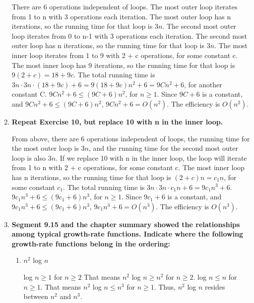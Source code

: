 \documentclass[10pt]{article}
\begin{document}
\begin{enumerate}
			\vspace{0.5cm}
			There are 6 operations independent of loops. The most outer loop iterates from 1 to n with 3 operations each iteration. The most outer loop has n iterations, so the running time for that loop is $3n$. The second most outer loop iterates from 0 to n-1 with 3 operations each iteration. The second most outer loop has n iterations, so the running time for that loop is $3n$. The most inner loop iterates from 1 to 9 with 2 + c operations, for some constant c. The most inner loop has 9 iterations, so the running time for that loop is $9(2 + c) = 18 + 9c$. The total running time is $3n \cdot 3n \cdot (18 + 9c) + 6 = 9(18 + 9c)n^2 + 6 = 9Cn^2 + 6$, for another constant C. $9Cn^2 + 6 \leq (9C + 6)n^2$, for $n \geq 1$. Since $9C + 6$ is a constant, and $9Cn^2 + 6 \leq (9C + 6)n^2$, $9Cn^2 + 6 = O(n^2)$. The efficiency is $O(n^2)$.
			\vspace{0.5cm}
		
		\setcounter{enumi}{10}
		\item \textbf{Repeat Exercise 10, but replace 10 with n in the inner loop.}
			
			\vspace{0.5cm}
			From above, there are 6 operations independent of loops, the running time for the most outer loop is $3n$, and the running time for the second most outer loop is also $3n$. If we replace 10 with n in the inner loop, the loop will iterate from 1 to n with 2 + c operations, for some constant c. The most inner loop  has n iterations, so the running time for that loop is $(2 + c)n = c_1n$, for some constant $c_1$. The total running time is $3n \cdot 3n \cdot c_1n + 6 = 9c_1n^3 + 6$. $9c_1n^3 + 6 \leq (9c_1 + 6)n^3$, for $n \geq 1$. Since $9c_1 + 6$ is a constant, and $9c_1n^3 + 6 \leq (9c_1 + 6)n^3$, $9c_1n^3 + 6 = O(n^3)$. The efficiency is $O(n^3)$.
			\vspace{0.5cm}
		
		\setcounter{enumi}{15}
		\item \textbf{Segment 9.15 and the chapter summary showed the relationships among typical growth-rate functions. Indicate where the following growth-rate functions belong in the ordering:}
			\begin{enumerate}
				\item $n^2$ log $n$
				
					\vspace{0.5cm}
					log $n \geq 1$ for $n \geq 2$ That means $n^2$ log $n \geq n^2$ for $n \geq 2$. log $n \leq n$ for $n \geq 1$. That means $n^2$ log $n \leq n^3$ for $n \geq 1$. Thus, $n^2$ log $n$ resides between $n^2$ and $n^3$.
					\vspace{0.5cm}
				

\end{enumerate}
\end{enumerate}
\end{document}
